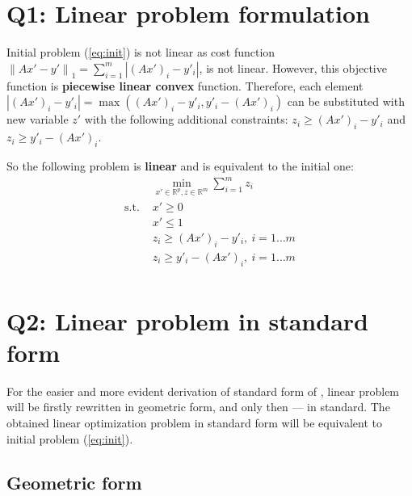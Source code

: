 \documentclass{article}
\def\R{\mathbb{R}}
\begin{document}
\section{Q1: Linear problem formulation}
Initial problem (\cref{eq:init}) is not linear as cost function
$ {\| Ax'-y' \|}_1 = \sum_{i=1}^{m} |{(Ax')}_i-y'_i|$, is not linear. However, this objective function is \textbf{piecewise linear convex} function. Therefore, each element $|{(Ax')}_i-y'_i| = \max({(Ax')}_i-y'_i, y'_i -{(Ax')}_i)$ can be substituted with new variable $z'$ with the following additional
constraints: $z_i \geq {(Ax')}_i-y'_i$ and $z_i \geq y'_i-{(Ax')}_i$.

So the following problem is \textbf{linear} and is equivalent to the initial one:
\begin{equation}\label{eq:linear}
  \begin{aligned}
                 & \min\limits_{x' \in \R^p, z \in \R^m} \sum_{i=1}^{m} z_i \\
    \text{s.t. } & x' \geq 0                                                \\
                 & x' \leq 1                                                \\
                 & z_i \geq {(Ax')}_i-y'_i, \ i = 1 \dots m                 \\
                 & z_i \geq y'_i-{(Ax')}_i, \ i = 1 \dots m                 \\
  \end{aligned}
\end{equation}

\section{Q2: Linear problem in standard form}

For the easier and more evident derivation of standard form of ,
linear problem will be firstly rewritten in geometric form, and only then --- in standard. The obtained linear optimization problem in standard form will be equivalent to initial problem (\cref{eq:init}).

\subsection{Geometric form}\label{sec:geom}
\end{document}
